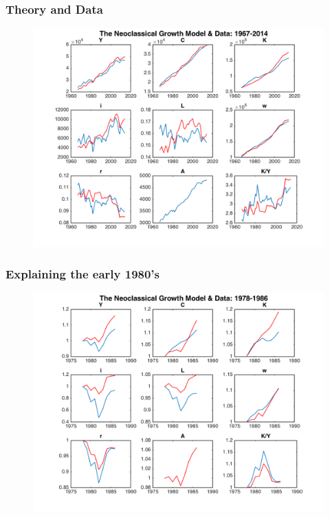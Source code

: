 \documentclass{beamer}
\begin{document}
\begin{frame}
\frametitle[alignment=center]{Theory and Data}
\begin{figure}
\centering
\includegraphics[scale=0.5]{Figures/Figure_7.png}
\end{figure}
\end{frame}

\begin{frame}
\frametitle[alignment=center]{Explaining the early 1980's}
\begin{figure}
\centering
\includegraphics[scale=0.5]{Figures/Figure_8.png}
\end{figure}
\end{frame}
\end{document}
